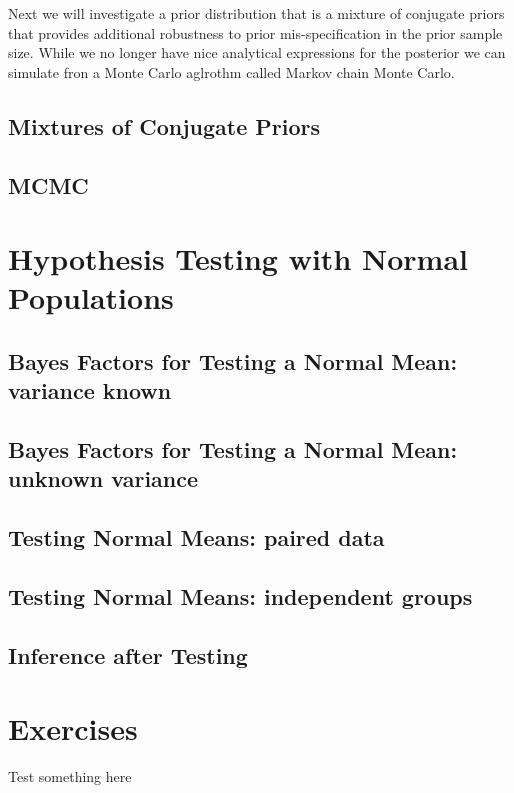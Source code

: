 \documentclass[]{book}
\theoremstyle{definition}
\theoremstyle{definition}
\theoremstyle{definition}
\theoremstyle{remark}
\begin{document}
Next we will investigate a prior distribution that is a mixture of
conjugate priors that provides additional robustness to prior
mis-specification in the prior sample size. While we no longer have nice
analytical expressions for the posterior we can simulate fron a Monte
Carlo aglrothm called Markov chain Monte Carlo.

\subsection{Mixtures of Conjugate Priors}\label{sec:NG-Cauchy}

\subsection{MCMC}\label{sec:NG-MCMC}

\section{Hypothesis Testing with Normal
Populations}\label{hypothesis-testing-with-normal-populations}

\subsection{Bayes Factors for Testing a Normal Mean: variance
known}\label{bayes-factors-for-testing-a-normal-mean-variance-known}

\subsection{Bayes Factors for Testing a Normal Mean: unknown
variance}\label{bayes-factors-for-testing-a-normal-mean-unknown-variance}

\subsection{Testing Normal Means: paired
data}\label{testing-normal-means-paired-data}

\subsection{Testing Normal Means: independent
groups}\label{testing-normal-means-independent-groups}

\subsection{Inference after Testing}\label{inference-after-testing}

\section{Exercises}\label{exercises-1}

Test something here


\end{document}
